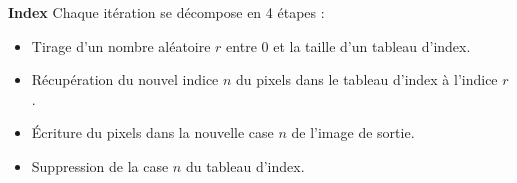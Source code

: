 \documentclass{beamer}
\begin{document}
\begin{frame}[t]
\begin{columns}[t]
\begin{column}{.5\linewidth}
\begin{block}{\centering \textbf{Index}}
                    Chaque itération se décompose en 4 étapes :
                    \begin{itemize}[label=-]
                        \item Tirage d'un nombre aléatoire $r$ entre 0 et la taille d'un tableau d'index.
                        \item Récupération du nouvel indice $n$ du pixels dans le tableau d'index à l'indice $r$.
                        \item Écriture du pixels dans la nouvelle case $n$ de l'image de sortie.
                        \item Suppression de la case $n$ du tableau d'index.
                    \end{itemize}
                \end{block}



\end{column}
\end{columns}
\end{frame}
\end{document}
